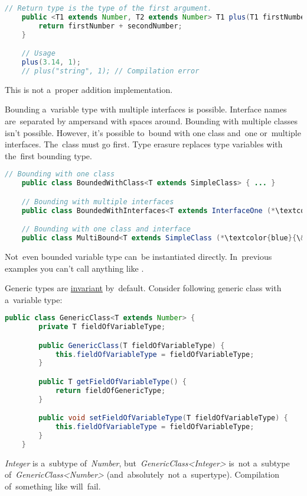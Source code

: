 \begin{lstlisting}[language=Java]
    // Return type is the type of the first argument.
    public <T1 extends Number, T2 extends Number> T1 plus(T1 firstNumber, T2 secondNumber) {
        return firstNumber + secondNumber;
    }

    // Usage
    plus(3.14, 1);
    // plus("string", 1); // Compilation error
\end{lstlisting}
\warningnonl This is not a~proper addition implementation.
\newline

\noindent Bounding a~variable type with multiple interfaces is possible.
Interface names are~separated by ampersand with spaces around.
Bounding with multiple classes isn't possible.
However, it's possible to~bound with one class and~one or~multiple interfaces.
The~class must go first.
Type erasure replaces type variables with the~first bounding type.

\newline
{}
\begin{lstlisting}[language=Java]
    // Bounding with one class
    public class BoundedWithClass<T extends SimpleClass> { ... }

    // Bounding with multiple interfaces
    public class BoundedWithInterfaces<T extends InterfaceOne (*\textcolor{blue}{\&}*) InterfaceTwo (*\textcolor{blue}{\&}*) InterfaceThree> { ... }

    // Bounding with one class and interface
    public class MultiBound<T extends SimpleClass (*\textcolor{blue}{\&}*) InterfaceOne> { ... }
\end{lstlisting}

\note Not~even bounded variable type can~be instantiated directly.
In~previous examples you can't call anything like .
\newpage

\label{javagenericswildcards}
Generic types are \hyperref[invariance]{invariant} by~default.
Consider following generic class with a~variable type:
\begin{lstlisting}[language=Java]
    public class GenericClass<T extends Number> {
        private T fieldOfVariableType;

        public GenericClass(T fieldOfVariableType) {
            this.fieldOfVariableType = fieldOfVariableType;
        }

        public T getFieldOfVariableType() {
            return fieldOfGenericType;
        }

        public void setFieldOfVariableType(T fieldOfVariableType) {
            this.fieldOfVariableType = fieldOfVariableType;
        }
    }
\end{lstlisting}
\noindent \textit{Integer} is a~subtype \mbox{of \textit{Number}}, \mbox{but \textit{GenericClass<Integer>}} is~not a~subtype \mbox{of \textit{GenericClass<Number>}} (and~absolutely~not a~supertype).
Compilation of~something like  will~fail.

